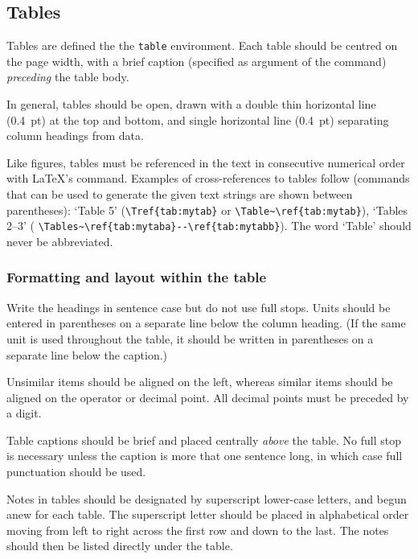\documentclass[12pt,twoside,a4paper]{cernrep}
\begin{document}
\subsection{Tables}

Tables are defined the the \texttt{table} environment.  Each table
should be centred on the page width, with a brief caption (specified
as argument of the  command) \emph{preceding} the table
body.

In general, tables should be open, drawn with a double thin horizontal
line (0.4~pt) at the top and bottom, and single horizontal line
(0.4~pt) separating column headings from data.

Like figures, tables must be referenced in the text in consecutive
numerical order with \LaTeX's  command. Examples of
cross-references to tables follow (commands that can be used to
generate the given text strings are shown between parentheses): `Table
5' (\eg \verb!\Tref{tab:mytab}! or \verb!\Table~\ref{tab:mytab}!),
`Tables 2--3' (\eg
\verb!\Tables~\ref{tab:mytaba}--\ref{tab:mytabb}!). The word `Table'
should never be abbreviated.

\subsubsection{Formatting and layout within the table}

Write the headings in sentence case but do not use full stops. Units
should be entered in parentheses on a separate line below the column
heading. (If the same unit is used throughout the table, it should be
written in parentheses on a separate line below the caption.)

Unsimilar items should be aligned on the left, whereas similar items
should be aligned on the operator or decimal point. All decimal points
must be preceded by a digit.


Table captions should be brief and placed centrally \emph{above} the
table. No full stop is necessary unless the caption is more that one
sentence long, in which case full punctuation should be used. 


Notes in tables should be designated by superscript lower-case
letters, and begun anew for each table. The superscript letter should
be placed in alphabetical order moving from left to right across the
first row and down to the last. The notes should then be listed
directly under the table.
\end{document}
